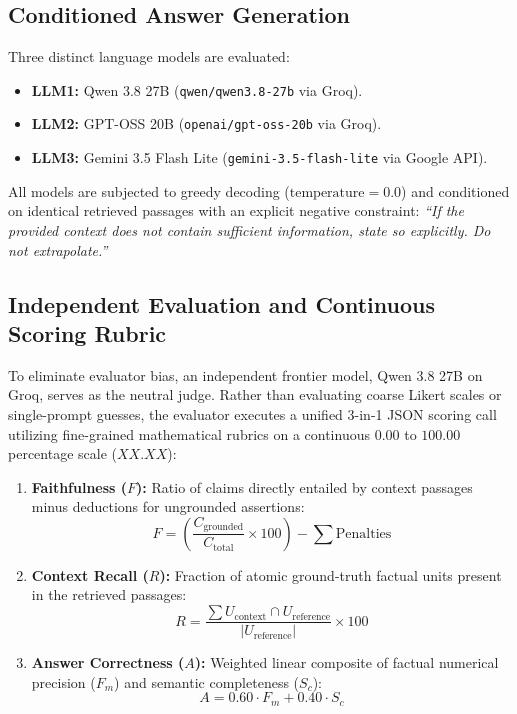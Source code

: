 \documentclass[conference]{IEEEtran}
\begin{document}
\subsection{Conditioned Answer Generation}
Three distinct language models are evaluated:
\begin{itemize}
    \item \textbf{LLM1:} Qwen 3.8 27B (\texttt{qwen/qwen3.8-27b} via Groq).
    \item \textbf{LLM2:} GPT-OSS 20B (\texttt{openai/gpt-oss-20b} via Groq).
    \item \textbf{LLM3:} Gemini 3.5 Flash Lite (\texttt{gemini-3.5-flash-lite} via Google API).
\end{itemize}

All models are subjected to greedy decoding ($\text{temperature} = 0.0$) and conditioned on identical retrieved passages with an explicit negative constraint: \textit{``If the provided context does not contain sufficient information, state so explicitly. Do not extrapolate.''}

\subsection{Independent Evaluation and Continuous Scoring Rubric}
To eliminate evaluator bias, an independent frontier model, Qwen 3.8 27B on Groq, serves as the neutral judge. Rather than evaluating coarse Likert scales or single-prompt guesses, the evaluator executes a unified 3-in-1 JSON scoring call utilizing fine-grained mathematical rubrics on a continuous $0.00$ to $100.00$ percentage scale ($XX.XX$):
\begin{enumerate}
    \item \textbf{Faithfulness ($F$):} Ratio of claims directly entailed by context passages minus deductions for ungrounded assertions:
    \begin{equation}
    F = \left(\frac{C_{\text{grounded}}}{C_{\text{total}}} \times 100\right) - \sum \text{Penalties}
    \end{equation}
    \item \textbf{Context Recall ($R$):} Fraction of atomic ground-truth factual units present in the retrieved passages:
    \begin{equation}
    R = \frac{\sum U_{\text{context}} \cap U_{\text{reference}}}{|U_{\text{reference}}|} \times 100
    \end{equation}
    \item \textbf{Answer Correctness ($A$):} Weighted linear composite of factual numerical precision ($F_m$) and semantic completeness ($S_c$):
    \begin{equation}
    A = 0.60 \cdot F_m + 0.40 \cdot S_c
    \end{equation}
\end{enumerate}
\end{document}
